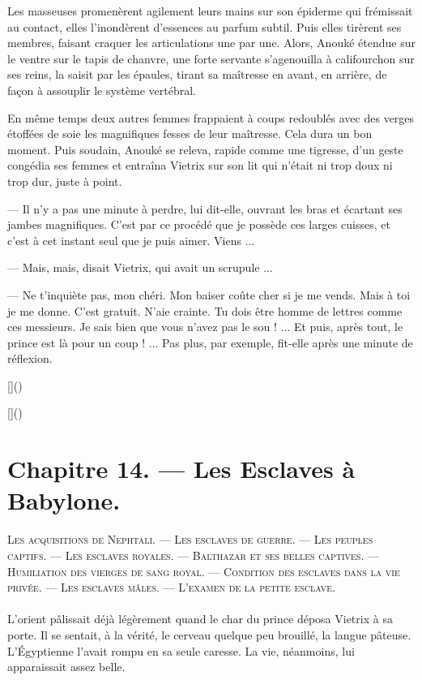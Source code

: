 \documentclass[a4paper, 11pt, oneside, polutonikogreek, french]{article}
\begin{document}
Les masseuses promenèrent agilement leurs mains sur son épiderme qui frémissait au contact, elles l'inondèrent d'essences au parfum subtil. Puis elles tirèrent ses membres, faisant craquer les articulations une par une. Alors, Anouké étendue sur le ventre sur le tapis de chanvre, une forte servante s'agenouilla à califourchon sur ses reins, la saisit par les épaules, tirant sa maîtresse en avant, en arrière, de façon à assouplir le système vertébral.

En même temps deux autres femmes frappaient à coups redoublés avec des verges étoffées de soie les magnifiques fesses de leur maîtresse. Cela dura un bon moment. Puis soudain, Anouké se releva, rapide comme une tigresse, d'un geste congédia ses femmes et entraîna Vietrix sur son lit qui n'était ni trop doux ni trop dur, juste à point.

--- Il n'y a pas une minute à perdre, lui dit-elle, ouvrant les bras et écartant ses jambes magnifiques. C'est par ce procédé que je possède ces larges cuisses, et c'est à cet instant seul que je puis aimer. Viens ...

--- Mais, mais, disait Vietrix, qui avait un scrupule ...

--- Ne t'inquiète pas, mon chéri. Mon baiser coûte cher si je me vends. Mais à toi je me donne. C'est gratuit. N'aie crainte. Tu dois être homme de lettres comme ces messieurs. Je sais bien que vous n'avez pas le sou ! ... Et puis, après tout, le prince est là pour un coup ! ... Pas plus, par exemple, fit-elle après une minute de réflexion.

[]()

[]()
\clearpage
\section{Chapitre 14. --- Les Esclaves à Babylone.}
\begin{center}
\scshape
\small
Les acquisitions de Nephtali. --- Les esclaves de guerre. --- Les peuples captifs. --- Les esclaves royales. --- Balthazar et ses belles captives. --- Humiliation des vierges de sang royal. --- Condition des esclaves dans la vie privée. --- Les esclaves mâles. --- L'examen de la petite esclave.
\end{center}
\paragraph{}
L'orient pâlissait déjà légèrement quand le char du prince déposa Vietrix à sa porte. Il se sentait, à la vérité, le cerveau quelque peu brouillé, la langue pâteuse. L'Égyptienne l'avait rompu en sa seule caresse. La vie, néanmoins, lui apparaissait assez belle.
\end{document}

